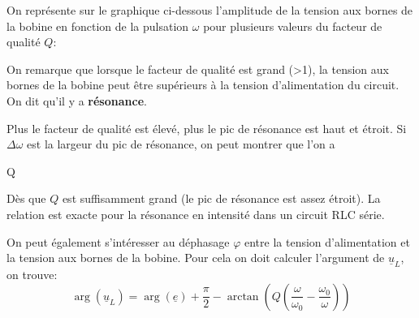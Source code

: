 \documentclass{cours}
\begin{document}
On représente sur le graphique ci-dessous l'amplitude de la tension aux bornes de la bobine en fonction de la pulsation $\omega$ pour plusieurs valeurs du facteur de qualité $Q$:

\begin{center}
\end{center}

On remarque que lorsque le facteur de qualité est grand (>1), la tension aux bornes de la bobine peut être supérieurs à la tension d'alimentation du circuit. On dit qu'il y a \textbf{résonance}.

Plus le facteur de qualité est élevé, plus le pic de résonance est haut et étroit. Si $\Delta\omega$ est la largeur du pic de résonance, on peut montrer que l'on a 
\begin{eqencadre}
 \approx Q
\end{eqencadre}
Dès que $Q$ est suffisamment grand (le pic de résonance est assez étroit). La relation est exacte pour la résonance en intensité dans un circuit RLC série.

On peut également s'intéresser au déphasage $\varphi$ entre la tension d'alimentation et la tension aux bornes de la bobine. Pour cela on doit calculer l'argument de $\underline{u}_L$, on trouve:
\begin{equation*}
\arg(\underline{u}_L)=\arg(\underline{e})+\frac{\pi}{2}-\arctan\left(Q \left( \frac{\omega}{\omega_0} - \frac{\omega_0}{\omega} \right)\right)
\end{equation*}
\end{document}
